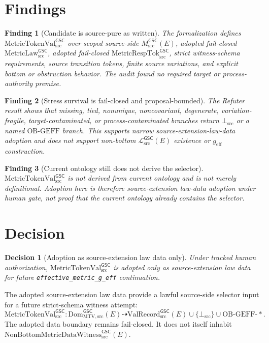 \documentclass[11pt]{article}
\newcommand{\MsrcGSC}{M_{\mathrm{src}}^{\mathsf{GSC}}}
\newcommand{\MetricLaw}{\mathrm{MetricLaw}_{\mathrm{src}}^{\mathsf{GSC}}}
\newcommand{\MetricRespTok}{\mathrm{MetricRespTok}_{\mathrm{src}}^{\mathsf{GSC}}}
\newcommand{\MetricTokenVal}{\mathrm{MetricTokenVal}_{\mathrm{src}}^{\mathsf{GSC}}}
\newcommand{\MetricData}{\mathcal{L}_{\mathrm{src}}^{\mathsf{GSC}}}
\newcommand{\Witness}{\mathrm{NonBottomMetricDataWitness}_{\mathrm{src}}^{\mathsf{GSC}}}
\newcommand{\BottomSrc}{\bot_{\mathrm{src}}}
\newcommand{\OBGEFF}{\mathrm{OB\mbox{-}GEFF}}
\newcommand{\geff}{g_{\mathrm{eff}}}
\newtheorem{decision}{Decision}
\newtheorem{finding}{Finding}
\begin{document}
\section{Findings}

\begin{finding}[Candidate is source-pure as written]
The formalization defines \(\MetricTokenVal\) over scoped source-side
\(\MsrcGSC(E)\), adopted fail-closed \(\MetricLaw\), adopted fail-closed
\(\MetricRespTok\), strict witness-schema requirements, source transition
tokens, finite source variations, and explicit bottom or obstruction behavior.
The audit found no required target or process-authority premise.
\end{finding}

\begin{finding}[Stress survival is fail-closed and proposal-bounded]
The Refuter result shows that missing, tied, nonunique, noncovariant,
degenerate, variation-fragile, target-contaminated, or process-contaminated
branches return \(\BottomSrc\) or a named \(\OBGEFF\) branch. This supports
narrow source-extension-law-data adoption and does not support non-bottom
\(\MetricData(E)\) existence or \(\geff\) construction.
\end{finding}

\begin{finding}[Current ontology still does not derive the selector]
\(\MetricTokenVal\) is not derived from current ontology and is not merely
definitional. Adoption here is therefore source-extension law-data adoption
under human gate, not proof that the current ontology already contains the
selector.
\end{finding}

\section{Decision}

\begin{decision}[Adoption as source-extension law data only]
Under tracked human authorization, \(\MetricTokenVal\) is adopted only as
source-extension law data for future \texttt{effective\_metric\_g\_eff}
continuation.
\end{decision}

The adopted source-extension law data provide a lawful source-side selector
input for a future strict-schema witness attempt:
\[
  \MetricTokenVal:
  \mathrm{Dom}_{\mathrm{MTV,src}}^{\mathsf{GSC}}(E)
  \dashrightarrow
  \mathrm{ValRecord}_{\mathrm{src}}^{\mathsf{GSC}}(E)
  \cup \{\BottomSrc\}
  \cup \OBGEFF\text{-}*.
\]
The adopted data boundary remains fail-closed. It does not itself inhabit
\(\Witness(E)\).
\end{document}
